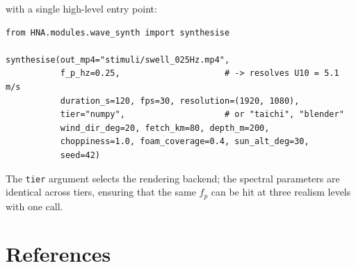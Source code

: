 \documentclass[11pt,a4paper]{article}
\newcommand{\code}[1]{\texttt{\small #1}}
\begin{document}
with a single high-level entry point:

\begin{lstlisting}
from HNA.modules.wave_synth import synthesise

synthesise(out_mp4="stimuli/swell_025Hz.mp4",
           f_p_hz=0.25,                     # -> resolves U10 = 5.1 m/s
           duration_s=120, fps=30, resolution=(1920, 1080),
           tier="numpy",                    # or "taichi", "blender"
           wind_dir_deg=20, fetch_km=80, depth_m=200,
           choppiness=1.0, foam_coverage=0.4, sun_alt_deg=30,
           seed=42)
\end{lstlisting}

The \code{tier} argument selects the rendering backend; the spectral
parameters are identical across tiers, ensuring that the same $f_p$ can
be hit at three realism levels with one call.

\section*{References}
\end{document}
